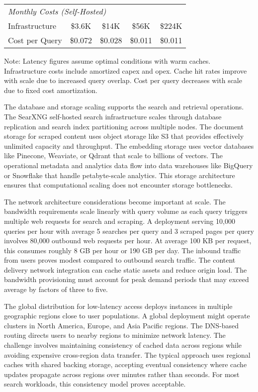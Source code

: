 \begin{table}[htbp]
{\begin{tabular}{lcccc}
\hline
\multicolumn{5}{l}{\textit{Monthly Costs (Self-Hosted)}} \\
Infrastructure & \$3.6K & \$14K & \$56K & \$224K \\
Cost per Query & \$0.072 & \$0.028 & \$0.011 & \$0.011 \\
\hline
\end{tabular}%
}
\begin{tablenotes}
\small
\item Note: Latency figures assume optimal conditions with warm caches. Infrastructure costs include amortized capex and opex. Cache hit rates improve with scale due to increased query overlap. Cost per query decreases with scale due to fixed cost amortization.
\end{tablenotes}
\end{table}


The database and storage scaling supports the search and retrieval operations. The SearXNG self-hosted search infrastructure scales through database replication and search index partitioning across multiple nodes. The document storage for scraped content uses object storage like S3 that provides effectively unlimited capacity and throughput. The embedding storage uses vector databases like Pinecone, Weaviate, or Qdrant that scale to billions of vectors. The operational metadata and analytics data flow into data warehouses like BigQuery or Snowflake that handle petabyte-scale analytics. This storage architecture ensures that computational scaling does not encounter storage bottlenecks.

The network architecture considerations become important at scale. The bandwidth requirements scale linearly with query volume as each query triggers multiple web requests for search and scraping. A deployment serving 10,000 queries per hour with average 5 searches per query and 3 scraped pages per query involves 80,000 outbound web requests per hour. At average 100 KB per request, this consumes roughly 8 GB per hour or 190 GB per day. The inbound traffic from users proves modest compared to outbound search traffic. The content delivery network integration can cache static assets and reduce origin load. The bandwidth provisioning must account for peak demand periods that may exceed average by factors of three to five.

The global distribution for low-latency access deploys instances in multiple geographic regions close to user populations. A global deployment might operate clusters in North America, Europe, and Asia Pacific regions. The DNS-based routing directs users to nearby regions to minimize network latency. The challenge involves maintaining consistency of cached data across regions while avoiding expensive cross-region data transfer. The typical approach uses regional caches with shared backing storage, accepting eventual consistency where cache updates propagate across regions over minutes rather than seconds. For most search workloads, this consistency model proves acceptable.

